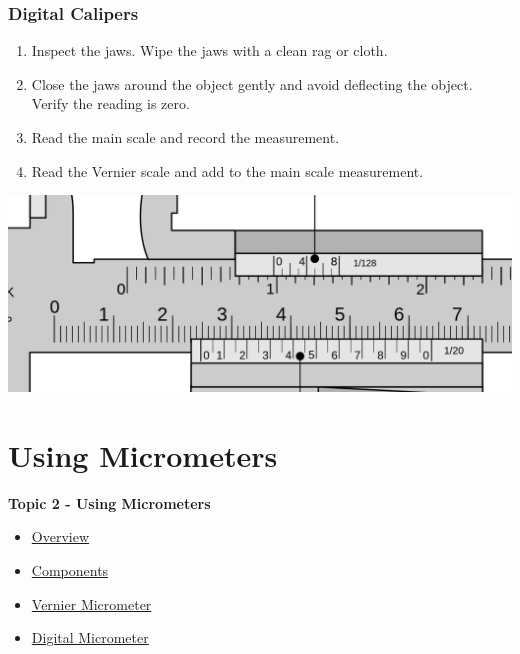 \documentclass[fleqn]{beamer} %
\newcommand{\sectionIItitle}{Using Micrometers}
\newcommand{\sectionIsubsectionIVtitle}{Digital Calipers}
\newcommand{\sectionIIsubsectionItitle}{Overview}
\newcommand{\sectionIIsubsectionIItitle}{Components}
\newcommand{\sectionIIsubsectionIIItitle}{Vernier Micrometer}
\newcommand{\sectionIIsubsectionIVtitle}{Digital Micrometer}
\begin{document}
			\begin{frame}
				\frametitle{\sectionIsubsectionIVtitle}

				\scriptsize
				\begin{multicols}{2}
				\begin{enumerate}
				\item Inspect the jaws. Wipe the jaws with a clean rag or cloth. \vspcc

				\item Close the jaws around the object gently and avoid deflecting the object. Verify the reading is zero. \vspcc

				\item Read the main scale and record the measurement. \vspcc

				\item Read the Vernier scale and add to the main scale measurement. \vspace{8mm}\\
				\end{enumerate}


				\includegraphics[scale=.15]{images/calipers_fig1_cropped.png}
				\end{multicols}
		

			\end{frame}



	\section{\sectionIItitle}\label{sectionII}

		\begin{frame}
			\large \textbf{Topic 2 - \sectionIItitle} \vspace{3mm}\\

			\begin{itemize}
				\item \hyperlink{sectionIIsubsectionI}{\sectionIIsubsectionItitle} \vspc %
				\item \hyperlink{sectionIIsubsectionII}{\sectionIIsubsectionIItitle} \vspc %
				\item \hyperlink{sectionIIsubsectionIII}{\sectionIIsubsectionIIItitle} \vspc %
				\item \hyperlink{sectionIIsubsectionIV}{\sectionIIsubsectionIVtitle} \vspc %
			\end{itemize}
		\end{frame}
\end{document}
